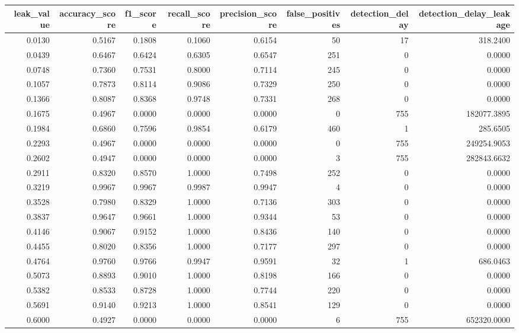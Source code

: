 \begin{tabular}{rrrrrrrr}
\toprule
leak\_value & accuracy\_score & f1\_score & recall\_score & precision\_score & false\_positives & detection\_delay & detection\_delay\_leakage \\
\midrule
0.0130 & 0.5167 & 0.1808 & 0.1060 & 0.6154 & 50 & 17 & 318.2400 \\
0.0439 & 0.6467 & 0.6424 & 0.6305 & 0.6547 & 251 & 0 & 0.0000 \\
0.0748 & 0.7360 & 0.7531 & 0.8000 & 0.7114 & 245 & 0 & 0.0000 \\
0.1057 & 0.7873 & 0.8114 & 0.9086 & 0.7329 & 250 & 0 & 0.0000 \\
0.1366 & 0.8087 & 0.8368 & 0.9748 & 0.7331 & 268 & 0 & 0.0000 \\
0.1675 & 0.4967 & 0.0000 & 0.0000 & 0.0000 & 0 & 755 & 182077.3895 \\
0.1984 & 0.6860 & 0.7596 & 0.9854 & 0.6179 & 460 & 1 & 285.6505 \\
0.2293 & 0.4967 & 0.0000 & 0.0000 & 0.0000 & 0 & 755 & 249254.9053 \\
0.2602 & 0.4947 & 0.0000 & 0.0000 & 0.0000 & 3 & 755 & 282843.6632 \\
0.2911 & 0.8320 & 0.8570 & 1.0000 & 0.7498 & 252 & 0 & 0.0000 \\
0.3219 & 0.9967 & 0.9967 & 0.9987 & 0.9947 & 4 & 0 & 0.0000 \\
0.3528 & 0.7980 & 0.8329 & 1.0000 & 0.7136 & 303 & 0 & 0.0000 \\
0.3837 & 0.9647 & 0.9661 & 1.0000 & 0.9344 & 53 & 0 & 0.0000 \\
0.4146 & 0.9067 & 0.9152 & 1.0000 & 0.8436 & 140 & 0 & 0.0000 \\
0.4455 & 0.8020 & 0.8356 & 1.0000 & 0.7177 & 297 & 0 & 0.0000 \\
0.4764 & 0.9760 & 0.9766 & 0.9947 & 0.9591 & 32 & 1 & 686.0463 \\
0.5073 & 0.8893 & 0.9010 & 1.0000 & 0.8198 & 166 & 0 & 0.0000 \\
0.5382 & 0.8533 & 0.8728 & 1.0000 & 0.7744 & 220 & 0 & 0.0000 \\
0.5691 & 0.9140 & 0.9213 & 1.0000 & 0.8541 & 129 & 0 & 0.0000 \\
0.6000 & 0.4927 & 0.0000 & 0.0000 & 0.0000 & 6 & 755 & 652320.0000 \\
\bottomrule
\end{tabular}

